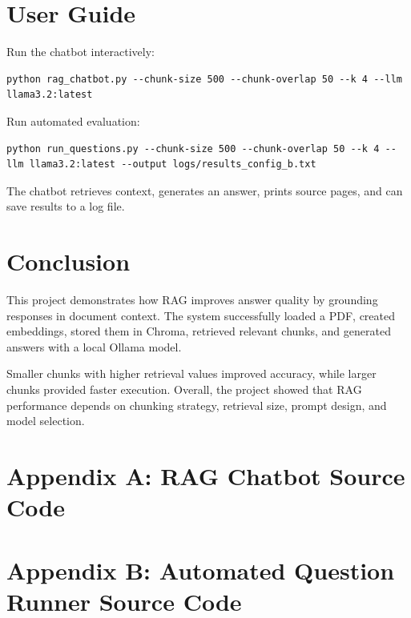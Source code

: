 \documentclass[11pt]{article}
\begin{document}
	\section{User Guide}
	
	Run the chatbot interactively:
	
	\begin{lstlisting}[style=terminal]
		python rag_chatbot.py --chunk-size 500 --chunk-overlap 50 --k 4 --llm llama3.2:latest
	\end{lstlisting}
	
	Run automated evaluation:
	
	\begin{lstlisting}[style=terminal]
		python run_questions.py --chunk-size 500 --chunk-overlap 50 --k 4 --llm llama3.2:latest --output logs/results_config_b.txt
	\end{lstlisting}
	
	The chatbot retrieves context, generates an answer, prints source pages, and can save results to a log file.
	
	\section{Conclusion}
	
	This project demonstrates how RAG improves answer quality by grounding responses in document context. The system successfully loaded a PDF, created embeddings, stored them in Chroma, retrieved relevant chunks, and generated answers with a local Ollama model.
	
	Smaller chunks with higher retrieval values improved accuracy, while larger chunks provided faster execution. Overall, the project showed that RAG performance depends on chunking strategy, retrieval size, prompt design, and model selection.
	
	\appendix
	
	\newpage
	
	\section{Appendix A: RAG Chatbot Source Code}
	
	
	
	\newpage
	
	\section{Appendix B: Automated Question Runner Source Code}
	
	
	
\end{document}
